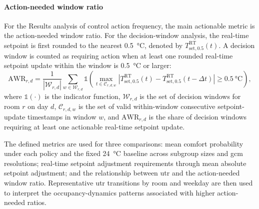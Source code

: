 \paragraph{Action-needed window ratio}
For the Results analysis of control action frequency, the main actionable metric is the action-needed window ratio.
For the decision-window analysis, the real-time setpoint is first rounded to the nearest \qty{0.5}{\celsius}, denoted by $T_{\mathrm{set},0.5}^{\mathrm{RT}}(t)$.
A decision window is counted as requiring action when at least one rounded real-time setpoint update within the window is \qty{0.5}{\celsius} or larger:
\begin{equation}
\mathrm{AWR}_{r,d}
=
\frac{1}{|\mathcal{W}_{r,d}|}
\sum_{w\in\mathcal{W}_{r,d}}
\mathbb{1}
\left(
\max_{t\in\mathcal{C}_{r,d,w}}
\left|
T_{\mathrm{set},0.5}^{\mathrm{RT}}(t)
-
T_{\mathrm{set},0.5}^{\mathrm{RT}}(t-\Delta t)
\right|
\geq \qty{0.5}{\celsius}
\right),
\label{eq:action_needed_window_ratio}
\end{equation}
where $\mathbb{1}(\cdot)$ is the indicator function, $\mathcal{W}_{r,d}$ is the set of decision windows for room $r$ on day $d$, $\mathcal{C}_{r,d,w}$ is the set of valid within-window consecutive setpoint-update timestamps in window $w$, and $\mathrm{AWR}_{r,d}$ is the share of decision windows requiring at least one actionable real-time setpoint update.

The defined metrics are used for three comparisons: mean comfort probability under each policy and the fixed \qty{24}{\celsius} baseline across subgroup sizes and \ac{gcm} resolutions; real-time setpoint adjustment requirements through mean absolute setpoint adjustment; and the relationship between \ac{utr} and the action-needed window ratio.
Representative \ac{utr} transitions by room and weekday are then used to interpret the occupancy-dynamics patterns associated with higher action-needed ratios.




